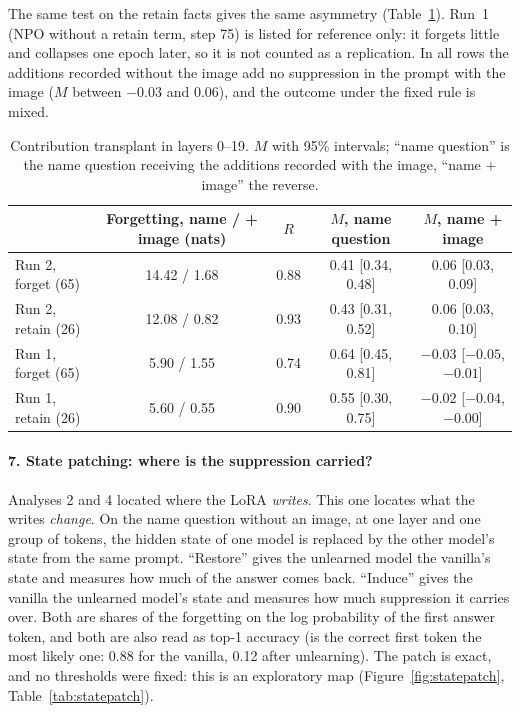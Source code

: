 \documentclass[11pt]{article}
\begin{document}
The same test on the retain facts gives the same asymmetry
(Table~\ref{tab:transplantrep}). Run~1 (NPO without a retain term, step 75) is listed for
reference only: it forgets little and collapses one epoch later, so it is not counted as
a replication. In all rows the additions recorded without the image add no suppression in
the prompt with the image ($M$ between $-0.03$ and $0.06$), and the outcome under the
fixed rule is mixed.

\begin{table}[htbp]
\centering\small
\begin{tabular}{@{}lcccc@{}}
\toprule
 & Forgetting, name / + image (nats) & $R$ & $M$, name question & $M$, name + image\\
\midrule
Run 2, forget (65) & 14.42 / 1.68 & 0.88 & 0.41 [0.34, 0.48] & 0.06 [0.03, 0.09]\\
Run 2, retain (26) & 12.08 / 0.82 & 0.93 & 0.43 [0.31, 0.52] & 0.06 [0.03, 0.10]\\
Run 1, forget (65) & 5.90 / 1.55 & 0.74 & 0.64 [0.45, 0.81] & $-0.03$ [$-0.05$, $-0.01$]\\
Run 1, retain (26) & 5.60 / 0.55 & 0.90 & 0.55 [0.30, 0.75] & $-0.02$ [$-0.04$, $-0.00$]\\
\bottomrule
\end{tabular}
\caption{Contribution transplant in layers 0--19. $M$ with 95\%
intervals; ``name question'' is the name question receiving the additions recorded with
the image, ``name + image'' the reverse.}
\label{tab:transplantrep}
\end{table}

\paragraph{7. State patching: where is the suppression carried?}
Analyses 2 and 4 located where the LoRA \emph{writes}. This one locates what the writes
\emph{change}. On the name question without an image, at one layer and one group of
tokens, the hidden state of one model is replaced by the other model's state from the same
prompt. ``Restore'' gives the unlearned model the vanilla's state and measures how much of
the answer comes back. ``Induce'' gives the vanilla the unlearned model's state and
measures how much suppression it carries over. Both are shares of the forgetting on the
log probability of the first answer token, and both are also read as top-1 accuracy (is
the correct first token the most likely one: 0.88 for the vanilla, 0.12 after
unlearning). The patch is exact, and no thresholds were fixed: this is an exploratory map
(Figure~\ref{fig:statepatch}, Table~\ref{tab:statepatch}).
\end{document}
